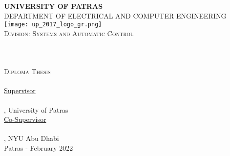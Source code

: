 \pagestyle{empty}

\begin{titlepage}
\begin{center}
\textsc{\textbf{\large UNIVERSITY OF PATRAS}\\
\large DEPARTMENT OF ELECTRICAL AND COMPUTER ENGINEERING}\\

\texttt{[image: up\_2017\_logo\_gr.png]}\\  

\textsc{Division: \large Systems and Automatic Control}\\[1cm]

\HRule \\[0.4cm]
{\huge \bfseries \thesistitle }\\[0.4cm] %
\HRule \\[1.5cm]

\textsc{\Large Diploma Thesis}\\[0.5cm]
\textsc{\textbf{\LARGE{\fullname}}}\\ [0.5cm]

\underline{\large Supervisor}\\[0.5cm]
\large \supname\\ \suptitle, University of Patras \\[1cm]
\underline{\large Co-Supervisor}\\[0.5cm]
\large \cosupname\\ \cosuptitle, NYU Abu Dhabi \\[1cm]
\vfill
\large{Patras - February 2022}
\end{center}
\end{titlepage}

